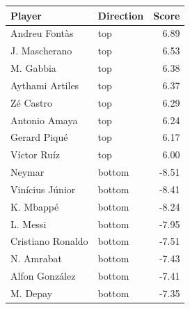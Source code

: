 
\begin{tabular}{llr}
\toprule
Player & Direction & Score\\
\midrule
Andreu Fontàs & top & 6.89\\
J. Mascherano & top & 6.53\\
M. Gabbia & top & 6.38\\
Aythami Artiles & top & 6.37\\
Zé Castro & top & 6.29\\
Antonio Amaya & top & 6.24\\
Gerard Piqué & top & 6.17\\
Víctor Ruíz & top & 6.00\\
Neymar & bottom & -8.51\\
Vinícius Júnior & bottom & -8.41\\
K. Mbappé & bottom & -8.24\\
L. Messi & bottom & -7.95\\
Cristiano Ronaldo & bottom & -7.51\\
N. Amrabat & bottom & -7.43\\
Alfon González & bottom & -7.41\\
M. Depay & bottom & -7.35\\
\bottomrule
\end{tabular}
